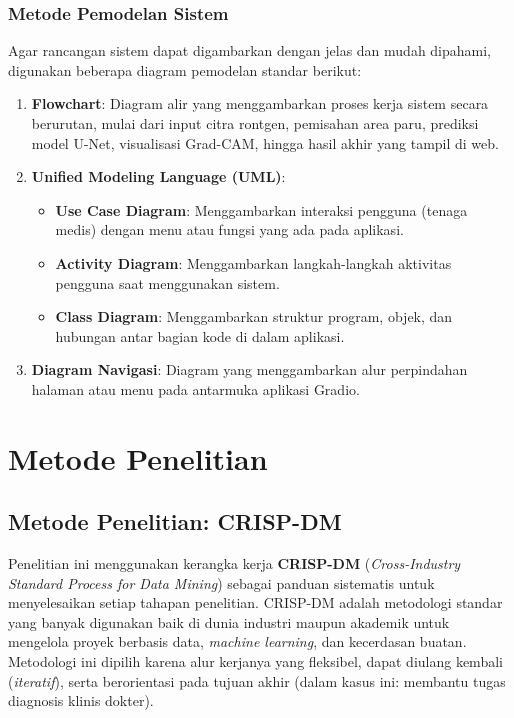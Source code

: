 \documentclass[12pt,a4paper,oneside]{book}
\begin{document}
\subsection{Metode Pemodelan Sistem}

Agar rancangan sistem dapat digambarkan dengan jelas dan mudah dipahami, digunakan beberapa diagram pemodelan standar berikut:

\begin{enumerate}
  \item \textbf{Flowchart}: Diagram alir yang menggambarkan proses kerja sistem secara berurutan, mulai dari input citra rontgen, pemisahan area paru, prediksi model U-Net, visualisasi Grad-CAM, hingga hasil akhir yang tampil di web.
  \item \textbf{Unified Modeling Language (UML)}:
  \begin{itemize}
    \item \textbf{Use Case Diagram}: Menggambarkan interaksi pengguna (tenaga medis) dengan menu atau fungsi yang ada pada aplikasi.
    \item \textbf{Activity Diagram}: Menggambarkan langkah-langkah aktivitas pengguna saat menggunakan sistem.
    \item \textbf{Class Diagram}: Menggambarkan struktur program, objek, dan hubungan antar bagian kode di dalam aplikasi.
  \end{itemize}
  \item \textbf{Diagram Navigasi}: Diagram yang menggambarkan alur perpindahan halaman atau menu pada antarmuka aplikasi Gradio.
\end{enumerate}


\chapter[METODE PENELITIAN]{Metode Penelitian}

\section{Metode Penelitian: CRISP-DM}

Penelitian ini menggunakan kerangka kerja \textbf{CRISP-DM} (\textit{Cross-Industry Standard Process for Data Mining}) sebagai panduan sistematis untuk menyelesaikan setiap tahapan penelitian. CRISP-DM adalah metodologi standar yang banyak digunakan baik di dunia industri maupun akademik untuk mengelola proyek berbasis data, \textit{machine learning}, dan kecerdasan buatan. Metodologi ini dipilih karena alur kerjanya yang fleksibel, dapat diulang kembali (\textit{iteratif}), serta berorientasi pada tujuan akhir (dalam kasus ini: membantu tugas diagnosis klinis dokter).
\end{document}
